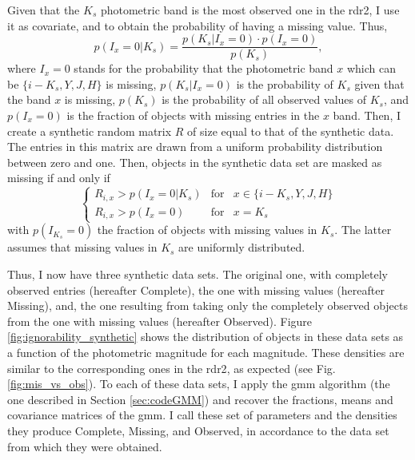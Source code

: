 Given that the $K_s$ photometric band is the most observed one in the \gls{rdr2}, I use it as covariate, and to obtain the probability of having a missing value. Thus,
\begin{equation}
p(I_x=0 | K_s)=\frac{p(K_s|I_x = 0)\cdot p(I_x=0)}{p(K_s)},\nonumber
\end{equation}
where $I_x=0$ stands for the probability that the photometric band $x$ which can be $\{i-K_s,Y,J,H\}$ is missing, $p(K_s|I_x = 0)$ is the probability of $K_s$ given that the band $x$ is missing, $p(K_s)$ is the probability of all observed values of $K_s$, and $p(I_x=0)$ is the fraction of objects with missing entries in the $x$ band. Then, I create a synthetic random matrix $R$ of size equal to that of the synthetic data. The entries in this matrix are drawn from a uniform probability distribution between zero and one. Then, objects in the synthetic data set are masked as missing if and only if 
\begin{equation}
\label{eq:mask_missing}
 \left\{ \begin{array}{rcl}
       R_{i,x} > p(I_x=0 | K_s) & \mbox{for} & x\in \{i-K_s,Y,J,H\} \\ 
       R_{i,x} > p(I_x=0 ) & \mbox{for} & x =K_s 
\end{array}\right.
\end{equation}
with $p(I_{K_s}=0 )$ the fraction of objects with missing values in $K_s$. The latter assumes that missing values in $K_s$ are uniformly distributed.

Thus, I now have three synthetic data sets. The original one, with completely observed entries (hereafter Complete), the one with missing values (hereafter Missing), and, the one resulting from taking only the completely observed objects from the one with missing values (hereafter Observed). Figure \ref{fig:ignorability_synthetic} shows the distribution of objects in these data sets as a function of the photometric magnitude for each magnitude. These densities are similar to the corresponding ones in the \gls{rdr2}, as expected (see Fig. \ref{fig:mis_vs_obs}). To each of these data sets, I apply the \gls{gmm} algorithm (the one described in Section \ref{sec:codeGMM}) and recover the fractions, means and covariance matrices of the \gls{gmm}. I call these set of parameters and the densities they produce Complete, Missing, and Observed, in accordance to the data set from which they were obtained.

